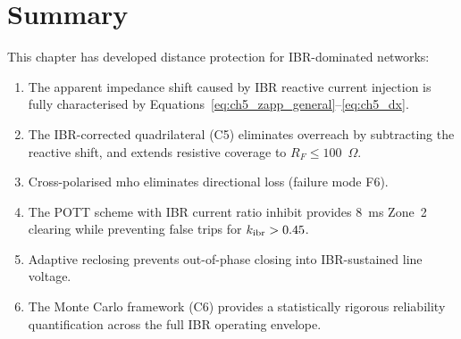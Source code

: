 
\section{Summary}
\label{sec:ch5_summary}

This chapter has developed distance protection for IBR-dominated networks:
\begin{enumerate}
\item The apparent impedance shift caused by IBR reactive current injection
      is fully characterised by Equations~\eqref{eq:ch5_zapp_general}--\eqref{eq:ch5_dx}.
\item The IBR-corrected quadrilateral (C5) eliminates overreach by
      subtracting the reactive shift, and extends resistive coverage to
      $R_F \leq 100$~$\Omega$.
\item Cross-polarised mho eliminates directional loss (failure mode F6).
\item The POTT scheme with IBR current ratio inhibit provides 8~ms
      Zone~2 clearing while preventing false trips for $k_\mathrm{ibr} > 0.45$.
\item Adaptive reclosing prevents out-of-phase closing into IBR-sustained
      line voltage.
\item The Monte Carlo framework (C6) provides a statistically rigorous
      reliability quantification across the full IBR operating envelope.
\end{enumerate}
